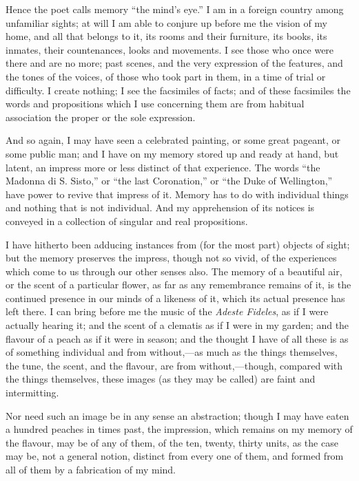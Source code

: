 Hence the poet calls memory ``the mind's eye.'' I am in a
foreign country among unfamiliar sights; at will I am able to conjure
up before me the vision of my home, and all that belongs to it, its
rooms and their furniture, its books, its inmates, their
countenances, looks and movements. I see those who once were there and
are no more; past scenes, and the very expression of the features, and
the tones of the voices, of those who took part in them, in a time of
trial or difficulty. I create nothing; I see the facsimiles of facts;
and of these facsimiles the words and propositions which I use
concerning them are from habitual association the proper or the sole
expression.

And so again, I may have seen a celebrated painting, or some great
pageant, or some public man; and I have on my memory stored up and
ready at hand, but latent, an impress more or less distinct of that
experience. The words ``the Madonna di S. Sisto,'' or
``the last Coronation,'' or ``the Duke of
Wellington,'' have power to revive that impress of it. Memory has
to do with individual things and nothing that is not individual. And
my apprehension of its notices is conveyed in a collection of singular
and real propositions.

I have hitherto been adducing instances from (for the most part)
objects of sight; but the memory preserves the impress, though not so
vivid, of the experiences which come to us through our other senses
also. The memory of a beautiful air, or the scent of a particular
flower, as far as any remembrance remains of it, is the continued
presence in our minds of a likeness of it, which its actual presence
has left there. I can bring before me the music of the \emph{Adeste
Fideles}, as if I were actually hearing it; and the scent of a
clematis as if I were in my garden; and the flavour of a peach as if
it were in season; and the thought I have of all these is as of
something individual and from without,—as much as the things
themselves, the tune, the scent, and the flavour, are from without,—though,
compared with the things themselves, these images (as they may be
called) are faint and intermitting.

Nor need such an image be in any sense an abstraction; though I may
have eaten a hundred peaches in times past, the impression, which
remains on my memory of the flavour, may be of any of them, of the
ten, twenty, thirty units, as the case may be, not a general notion,
distinct from every one of them, and formed from all of them by a
fabrication of my mind.

